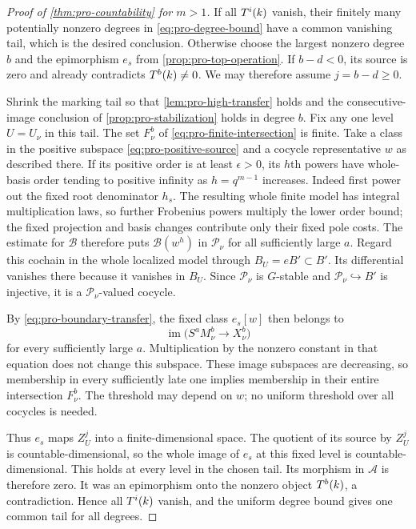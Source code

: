 \begin{proof}[Proof of \cref{thm:pro-countability} for $m>1$]
If all $T^i(k)$ vanish, their finitely many potentially
nonzero degrees in \cref{eq:pro-degree-bound} have a common
vanishing tail, which is the desired conclusion.  Otherwise
choose the largest nonzero degree $b$ and the epimorphism
$e_s$ from \cref{prop:pro-top-operation}.
If $b-d<0$, its source is zero and already contradicts
$T^b(k)\ne0$.  We may therefore assume $j=b-d\geq0$.

Shrink the marking tail so that
\cref{lem:pro-high-transfer} holds and the consecutive-image
conclusion of \cref{prop:pro-stabilization} holds in degree
$b$.  Fix any one level $U=U_\nu$ in this tail.  The set
$F^b_\nu$ of \cref{eq:pro-finite-intersection} is finite.
Take a class in the positive subspace
\cref{eq:pro-positive-source} and a cocycle representative
$w$ as described there.  If its positive order is at least
$\epsilon>0$, its $h$th powers have whole-basis order tending
to positive infinity as $h=q^{m-1}$ increases.  Indeed first
power out the fixed root denominator $h_s$.  The resulting
whole finite model has integral multiplication laws, so
further Frobenius powers multiply the lower order bound;
the fixed projection and basis changes contribute only their
fixed pole costs.  The estimate for $\mathcal B$ therefore
puts $\mathcal B(w^h)$ in $\mathcal P_\nu$ for all
sufficiently large $a$.  Regard this cochain in the whole
localized model through $B_U=eB'\subset B'$.  Its differential
vanishes there because it vanishes in $B_U$.  Since
$\mathcal P_\nu$ is $G$-stable and
$\mathcal P_\nu\hookrightarrow B'$ is injective, it is a
$\mathcal P_\nu$-valued cocycle.

By \cref{eq:pro-boundary-transfer}, the fixed class $e_s[w]$
then belongs to
\[
 \operatorname{im}\bigl(S^aM^b_\nu\to X^b_\nu\bigr)
\]
for every sufficiently large $a$.  Multiplication by the
nonzero constant in that equation does not change this
subspace.  These image subspaces are decreasing, so membership
in every sufficiently late one implies membership in their
entire intersection $F^b_\nu$.  The threshold may depend on
$w$; no uniform threshold over all cocycles is needed.

Thus $e_s$ maps $Z_U^j$ into a finite-dimensional space.
The quotient of its source by $Z_U^j$ is countable-dimensional,
so the whole image of $e_s$ at this fixed level is
countable-dimensional.  This holds at every level in the
chosen tail.  Its morphism in $\mathcal A$ is therefore zero.
It was an epimorphism onto the nonzero object $T^b(k)$,
a contradiction.  Hence all $T^i(k)$ vanish, and the
uniform degree bound gives one common tail for all degrees.
\end{proof}

